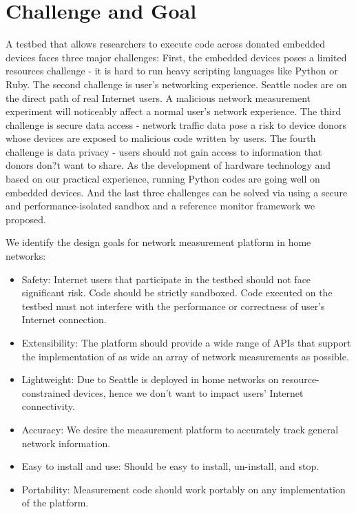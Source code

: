 \documentclass[11pt, oneside]{article}   	%
\begin{document}
\section{Challenge and Goal}
\label{sec.goal}
A testbed that allows researchers to execute code across donated embedded devices faces three major challenges: First, the embedded devices poses a limited resources challenge - it is hard to run heavy scripting languages like Python or Ruby. The second challenge is user's networking experience. Seattle nodes are on the direct path of real Internet users. A malicious network measurement experiment will noticeably affect a normal user's network experience. The third challenge is secure data access - network traffic data pose a risk to device donors whose devices are exposed to malicious code written by users. The fourth challenge is data privacy - users should not gain access to information that donors don?t want to share. As the development of hardware technology and based on our practical experience, running Python codes are going well on embedded devices. And the last three challenges can be solved via using a secure and performance-isolated sandbox and a reference monitor framework we proposed.

We identify the design goals for network measurement platform in home networks:
\begin{itemize}
\item Safety: Internet users that participate in the testbed should not face significant risk. Code should be strictly sandboxed. Code executed on the testbed must not interfere with the performance or correctness of user's Internet connection.
\item Extensibility: The platform should provide a wide range of APIs that support the implementation of as wide an array of network measurements as possible.
\item Lightweight: Due to Seattle is deployed in home networks on resource-constrained devices, hence we don't want to impact users' Internet connectivity.
\item Accuracy: We desire the measurement platform to accurately track general network information. 
\item Easy to install and use: Should be easy to install, un-install, and stop. 
\item Portability: Measurement code should work portably on any implementation of the platform.
\end{itemize}
\end{document}
